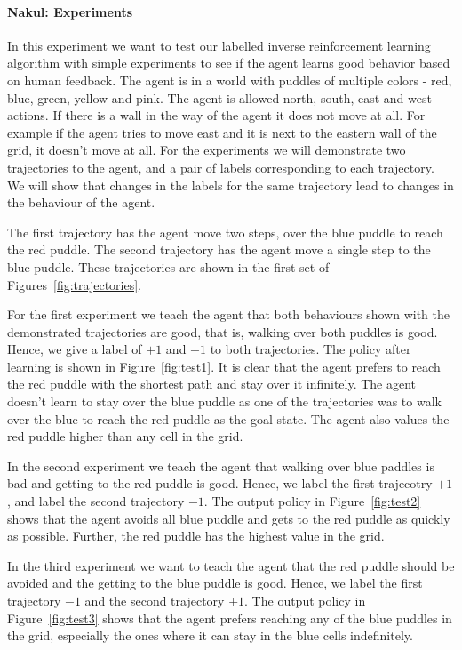 
\paragraph{Nakul: Experiments}

In this experiment we want to test our labelled inverse reinforcement
learning algorithm with simple experiments to see if the agent learns
good behavior based on human feedback.  The agent is in a world with
puddles of multiple colors - red, blue, green, yellow and pink. The
agent is allowed north, south, east and west actions.  If there is a
wall in the way of the agent it does not move at all. For example if
the agent tries to move east and it is next to the eastern wall of the
grid, it doesn't move at all.  For the experiments we will demonstrate
two trajectories to the agent, and a pair of labels corresponding to
each trajectory.  We will show that changes in the labels for the same
trajectory lead to changes in the behaviour of the agent.

The first trajectory has the agent move two steps, over the blue
puddle to reach the red puddle.  The second trajectory has the agent
move a single step to the blue puddle.  These trajectories are shown
in the first set of Figures~\ref{fig:trajectories}.

For the first experiment we teach the agent that both behaviours shown
with the demonstrated trajectories are good, that is, walking over
both puddles is good.  Hence, we give a label of $+1$ and $+1$ to both
trajectories. The policy after learning is shown in
Figure~\ref{fig:test1}.  It is clear that the agent prefers to reach
the red puddle with the shortest path and stay over it infinitely. The
agent doesn't learn to stay over the blue puddle as one of the
trajectories was to walk over the blue to reach the red puddle as the
goal state. The agent also values the red puddle higher than any cell
in the grid.

In the second experiment we teach the agent that walking over blue
paddles is bad and getting to the red puddle is good. Hence, we label
the first trajecotry $+1$, and label the second trajectory $-1$.  The
output policy in Figure~\ref{fig:test2} shows that the agent avoids
all blue puddle and gets to the red puddle as quickly as
possible. Further, the red puddle has the highest value in the grid.

In the third experiment we want to teach the agent that the red puddle
should be avoided and the getting to the blue puddle is good. Hence,
we label the first trajectory $-1$ and the second trajectory $+1$.
The output policy in Figure~\ref{fig:test3} shows that the agent
prefers reaching any of the blue puddles in the grid, especially the
ones where it can stay in the blue cells indefinitely.

